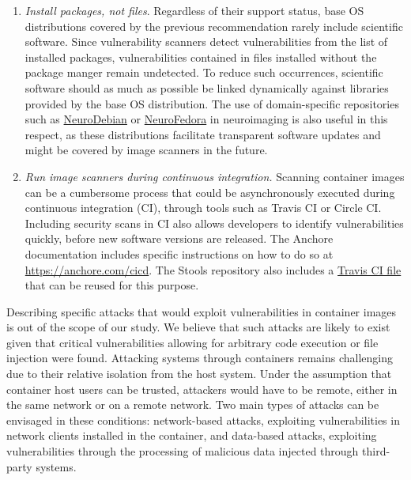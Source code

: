 \documentclass[a4paper,num-refs]{oup-contemporary}
\newcommand{\revision}[1]{\color{ao(english)}#1\color{black}\xspace}
\begin{document}
\begin{enumerate}[leftmargin=0pt,itemindent=*]
\item \emph{Install packages, not files}. \revision{Regardless of their support status, base OS distributions 
covered by the previous recommendation rarely include 
scientific software. Since 
 vulnerability scanners detect vulnerabilities from the list of installed packages}, vulnerabilities contained in
\revision{files installed without the package manger remain undetected.} \revision{To reduce such occurrences, scientific software 
should as much as possible be linked dynamically against libraries provided by the base OS distribution. The use of} domain-specific
\revision{repositories} such as \href{http://neuro.debian.net}{NeuroDebian} or
\href{https://docs.fedoraproject.org/en-US/neurofedora/overview/}{NeuroFedora}
in neuroimaging \revision{is also} useful in this respect\revision{, as
these distributions facilitate transparent software updates and might be covered by image scanners in the future}.

\item \emph{Run image scanners during continuous integration.} Scanning
container images can be a cumbersome process that
could be asynchronously executed during continuous integration (CI),
through tools such as Travis CI or Circle CI. Including security scans in
CI also allows developers to identify vulnerabilities quickly,
before new software versions are released. \revision{The Anchore documentation includes
specific instructions on how to do so at \url{https://anchore.com/cicd}. The Stools repository also includes 
a \href{https://github.com/singularityhub/stools-clair/blob/master/.travis.yml}{Travis CI file}
that can be reused for this purpose.}
\end{enumerate}

Describing specific attacks that would exploit
vulnerabilities in container images is out of the scope of our study. We
believe that such attacks are likely to exist \revision{given that critical vulnerabilities 
allowing for arbitrary code execution or file injection were found.}
Attacking
systems through containers remains challenging due to their relative isolation
from the host system. Under the assumption that \revision{container host}
users can be trusted, attackers would have to be remote,
either in the same network or on a remote network. Two main types of
attacks can be envisaged in these conditions: network-based attacks,
exploiting vulnerabilities in network clients installed in the container,
and data-based attacks, exploiting vulnerabilities through the processing
of malicious data injected through third-party systems.
\end{document}
